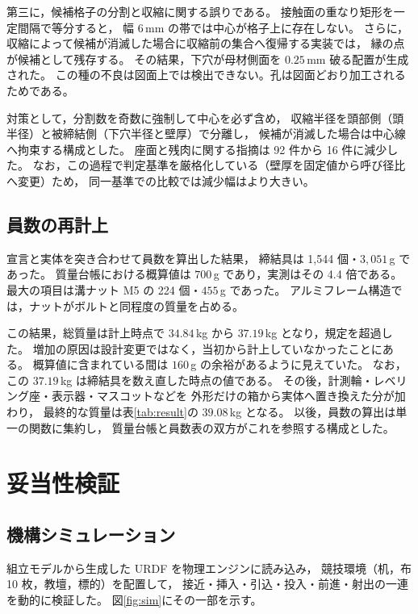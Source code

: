 \documentclass[a4paper,10pt,twocolumn]{ltjsarticle}
\newcommand{\mm}{\ensuremath{\,\mathrm{mm}}}
\begin{document}
第三に，候補格子の分割と収縮に関する誤りである。
接触面の重なり矩形を一定間隔で等分すると，
幅 $6\mm$ の帯では中心が格子上に存在しない。
さらに，収縮によって候補が消滅した場合に収縮前の集合へ復帰する実装では，
縁の点が候補として残存する。
その結果，下穴が母材側面を $0.25\mm$ 破る配置が生成された。
この種の不良は図面上では検出できない。孔は図面どおり加工されるためである。

対策として，分割数を奇数に強制して中心を必ず含め，
収縮半径を頭部側（頭半径）と被締結側（下穴半径と壁厚）で分離し，
候補が消滅した場合は中心線へ拘束する構成とした。
座面と残肉に関する指摘は 92 件から 16 件に減少した。
なお，この過程で判定基準を厳格化している（壁厚を固定値から呼び径比へ変更）ため，
同一基準での比較では減少幅はより大きい。

\subsection{員数の再計上}

宣言と実体を突き合わせて員数を算出した結果，
締結具は 1{,}544 個・$3{,}051\,$g であった。
質量台帳における概算値は $700\,$g であり，実測はその 4.4 倍である。
最大の項目は溝ナット M5 の 224 個・$455\,$g であった。
アルミフレーム構造では，ナットがボルトと同程度の質量を占める。

この結果，総質量は計上時点で $34.84\,$kg から $37.19\,$kg となり，規定を超過した。
増加の原因は設計変更ではなく，当初から計上していなかったことにある。
概算値に含まれている間は $160\,$g の余裕があるように見えていた。
なお，この $37.19\,$kg は締結具を数え直した時点の値である。
その後，計測輪・レベリング座・表示器・マスコットなどを
外形だけの箱から実体へ置き換えた分が加わり，
最終的な質量は表\ref{tab:result}の $39.08\,$kg となる。
以後，員数の算出は単一の関数に集約し，
質量台帳と員数表の双方がこれを参照する構成とした。

\section{妥当性検証}

\subsection{機構シミュレーション}

組立モデルから生成した URDF を物理エンジン\cite{coumans2021}に読み込み，
競技環境（机，布 10 枚，教壇，標的）を配置して，
接近・挿入・引込・投入・前進・射出の一連を動的に検証した。
図\ref{fig:sim}にその一部を示す。
\end{document}
